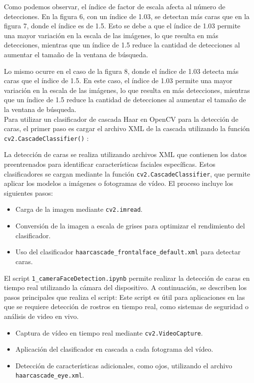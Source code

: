 \documentclass[a4paper]{article}
\begin{document}
Como podemos observar, el índice de factor de escala afecta al número de detecciones. En la figura 6, con un índice de 1.03, se detectan más caras que en la figura 7, donde el índice es de 1.5. Esto se debe a que el índice de 1.03 permite una mayor variación en la escala de las imágenes, lo que resulta en más detecciones, mientras que un índice de 1.5 reduce la cantidad de detecciones al aumentar el tamaño de la ventana de búsqueda.

Lo mismo ocurre en el caso de la figura 8, donde el índice de 1.03 detecta más caras que el índice de 1.5. En este caso, el índice de 1.03 permite una mayor variación en la escala de las imágenes, lo que resulta en más detecciones, mientras que un índice de 1.5 reduce la cantidad de detecciones al aumentar el tamaño de la ventana de búsqueda.\\

Para utilizar un clasificador de cascada Haar en OpenCV para la detección de caras, el primer paso es cargar el archivo XML de la cascada utilizando la función \texttt{cv2.CascadeClassifier()} :

La detección de caras se realiza utilizando archivos XML que contienen los datos preentrenados para identificar características faciales específicas. Estos clasificadores se cargan mediante la función \texttt{cv2.CascadeClassifier}, que permite aplicar los modelos a imágenes o fotogramas de vídeo.
El proceso incluye los siguientes pasos:

\begin{itemize}
    \item Carga de la imagen mediante \texttt{cv2.imread}.
    \item Conversión de la imagen a escala de grises para optimizar el rendimiento del clasificador.
    \item Uso del clasificador \texttt{haarcascade\_frontalface\_default.xml} para detectar caras.
\end{itemize}

El script \texttt{1\_cameraFaceDetection.ipynb} permite realizar la detección de caras en tiempo real utilizando la cámara del dispositivo. A continuación, se describen los pasos principales que realiza el script:
Este script es útil para aplicaciones en las que se requiere detección de rostros en tiempo real, como sistemas de seguridad o análisis de video en vivo.

\begin{itemize}
    \item Captura de vídeo en tiempo real mediante \texttt{cv2.VideoCapture}.
    \item Aplicación del clasificador en cascada a cada fotograma del vídeo.
    \item Detección de características adicionales, como ojos, utilizando el archivo \texttt{haarcascade\_eye.xml}.
\end{itemize}
\end{document}
